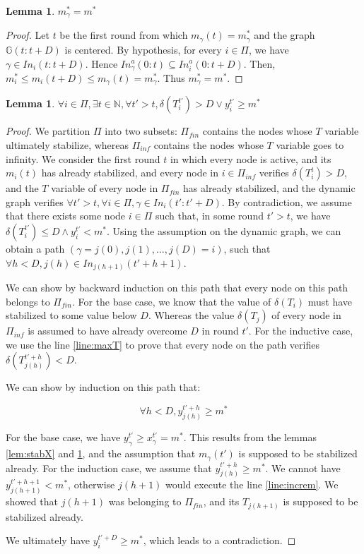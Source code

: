 \documentclass[11pt,letterpaper]{article}
\newtheorem{lem}[thm]{Lemma}
\begin{document}
\begin{lem} \label{lem:stabM}
	$m_\gamma^* = m^*$
\end{lem}
\begin{proof}
	Let $t$ be the first round from which $m_\gamma(t) = m^*_\gamma$ and the graph $\mathds{G}(t:t+D)$ is centered.
	By hypothesis, for every $i \in \Pi$, we have $\gamma \in In_i(t:t+D)$.
	Hence $In_\gamma^a(0:t) \subseteq In_i^a(0:t+D)$.
	Then, $m_i^* \leq m_i(t+D) \leq m_\gamma(t) = m_\gamma^*$.
	Thus $m_\gamma^* = m^*$.
\end{proof}

\begin{lem} \label{lem:learnBound}
	$\forall i \in \Pi, \exists t \in \mathds{N}, \forall t' > t, \delta(T_i^{t'}) > D \vee y_i^{t'} \geq m^*$
\end{lem}
\begin{proof}
	We partition $\Pi$ into two subsets: $\Pi_{fin}$ contains the nodes whose $T$ variable ultimately stabilize, whereas $\Pi_{inf}$ contains the nodes
	whose $T$ variable goes to infinity.
	We consider the first round $t$ in which every node is active, and its $m_i(t)$ has already stabilized,
	and every node in $i \in \Pi_{inf}$ verifies $\delta(T_i^t) > D$,
	and the $T$ variable of every node in $\Pi_{fin}$ has already stabilized,
	and the dynamic graph verifies $\forall t' > t, \forall i \in \Pi, \gamma \in In_i(t':t'+D)$.
	By contradiction, we assume that there exists some node $i \in \Pi$
	such that, in some round $t' > t$, we have $\delta(T_i^{t'}) \leq D \wedge y_i^{t'} < m^*$.
	Using the assumption on the dynamic graph, we can obtain a path $(\gamma = j(0), j(1), \dots, j(D) = i)$,
	such that $\forall h < D, j(h) \in In_{j(h+1)}(t'+h+1)$.

	We can show by backward induction on this path that every node on this path belongs to $\Pi_{fin}$.
	For the base case, we know that the value of $\delta(T_i)$ must have stabilized to some value below $D$.
	Whereas the value $\delta(T_j)$ of every node in $\Pi_{inf}$ is assumed to have already overcome $D$ in round $t'$.
	For the inductive case, we use the line \ref{line:maxT} to prove that every node on the path verifies $\delta(T_{j(h)}^{t'+h}) < D$.

	We can show by induction on this path that:

	$$\forall h < D, y_{j(h)}^{t'+h} \geq m^*$$

	For the base case, we have $y_\gamma^{t'} \geq x_\gamma^{t'} = m^*$.
	This results from the lemmas \ref{lem:stabX} and \ref{lem:stabM}, and the assumption that $m_\gamma(t')$ is supposed to be stabilized already.
	For the induction case, we assume that $y_{j(h)}^{t'+h} \geq m^*$.
	We cannot have $y_{j(h+1)}^{t'+h+1} < m^*$, otherwise $j(h+1)$ would execute the line \ref{line:increm}. We showed that $j(h+1)$ was belonging to $\Pi_{fin}$,
	and its $T_{j(h+1)}$ is supposed to be stabilized already.
	
	We ultimately have $y_i^{t'+D} \geq m^*$, which leads to a contradiction.
\end{proof}
\end{document}
